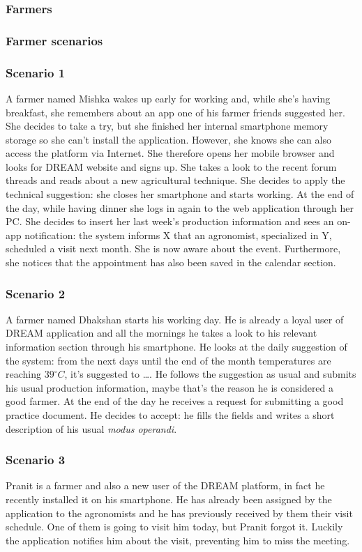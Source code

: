 \subsubsection{Farmers}
\subsubsection*{Farmer scenarios}

\subsubsection*{Scenario 1}
A farmer named Mishka wakes up early for working and, while she's having breakfast, she remembers about an app one of his farmer friends suggested her. She decides to take a try, but she finished her internal smartphone memory storage so she can't install the application. However, she knows she can also access the platform via Internet. She therefore opens her mobile browser and looks for DREAM website and signs up. She takes a look to the recent forum threads and reads about a new agricultural technique. She decides to apply the technical suggestion: she closes her smartphone and starts working. At the end of the day, while having dinner she logs in again to the web application through her PC. She decides to insert her last week's production information and sees an on-app notification: the system informs X that an agronomist, specialized in Y, scheduled a visit next month. She is now aware about the event. Furthermore, she notices that the appointment has also been saved in the calendar section.

\subsubsection*{Scenario 2}
A farmer named Dhakshan starts his working day. He is already a loyal user of DREAM application and all the mornings he takes a look to his relevant information section through his smartphone. He looks at the daily suggestion of the system: from the next days until the end of the month temperatures are reaching $39^\circ C$, it's suggested to \ldots. He follows the suggestion as usual and submits his usual production information, maybe that's the reason he is considered a good farmer. At the end of the day he receives a request for submitting a good practice document. He decides to accept: he fills the fields and writes a short description of his usual \textit{modus operandi}.

\subsubsection*{Scenario 3}
Pranit is a farmer and also a new user of the DREAM platform, in fact he recently installed it on his smartphone. He has already been assigned by the application to the agronomists and he has previously received by them their visit schedule. One of them is going to visit him today, but Pranit forgot it. Luckily the application notifies him about the visit, preventing him to miss the meeting.

